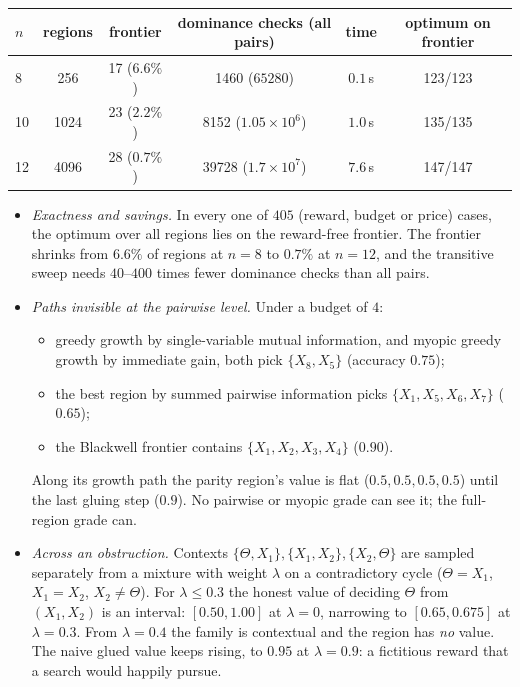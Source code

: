 \documentclass[11pt]{article}
\theoremstyle{definition}
\theoremstyle{remark}
\begin{document}
\begin{center}\small
\begin{tabular}{lccccc}
\toprule
$n$ & regions & frontier & dominance checks (all pairs) & time & optimum on frontier\\
\midrule
8 & 256 & 17 ($6.6\%$) & 1460 ($65280$) & $0.1$\,s & 123/123\\
10 & 1024 & 23 ($2.2\%$) & 8152 ($1.05\times10^6$) & $1.0$\,s & 135/135\\
12 & 4096 & 28 ($0.7\%$) & 39728 ($1.7\times10^7$) & $7.6$\,s & 147/147\\
\bottomrule
\end{tabular}
\end{center}
\vspace{-0.6em}\label{tab:blackwell}
\vspace{0.4em}

\begin{itemize}
  \item \emph{Exactness and savings.} In every one of $405$ (reward, budget or price) cases, the optimum over all regions lies on the reward-free frontier. The frontier shrinks from $6.6\%$ of regions at $n=8$ to $0.7\%$ at $n=12$, and the transitive sweep needs $40$--$400$ times fewer dominance checks than all pairs.
  \item \emph{Paths invisible at the pairwise level.} Under a budget of $4$:
  \begin{itemize}
    \item greedy growth by single-variable mutual information, and myopic greedy growth by immediate gain, both pick $\{X_8,X_5\}$ (accuracy $0.75$);
    \item the best region by summed pairwise information picks $\{X_1,X_5,X_6,X_7\}$ ($0.65$);
    \item the Blackwell frontier contains $\{X_1,X_2,X_3,X_4\}$ ($0.90$).
  \end{itemize}
  Along its growth path the parity region's value is flat ($0.5,0.5,0.5,0.5$) until the last gluing step ($0.9$). No pairwise or myopic grade can see it; the full-region grade can.
  \item \emph{Across an obstruction.} Contexts $\{\Theta,X_1\},\{X_1,X_2\},\{X_2,\Theta\}$ are sampled separately from a mixture with weight $\lambda$ on a contradictory cycle ($\Theta=X_1$, $X_1=X_2$, $X_2\ne\Theta$). For $\lambda\le0.3$ the honest value of deciding $\Theta$ from $(X_1,X_2)$ is an interval: $[0.50,1.00]$ at $\lambda=0$, narrowing to $[0.65,0.675]$ at $\lambda=0.3$. From $\lambda=0.4$ the family is contextual and the region has \emph{no} value. The naive glued value keeps rising, to $0.95$ at $\lambda=0.9$: a fictitious reward that a search would happily pursue.
\end{itemize}
\end{document}
